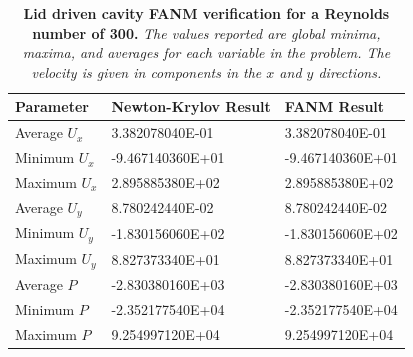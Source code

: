 \begin{table}[h!]
  \begin{center}
    \begin{tabular}{lll}\hline\hline
      \multicolumn{1}{l}{Parameter}& 
      \multicolumn{1}{l}{Newton-Krylov Result}&
      \multicolumn{1}{l}{FANM Result}\\
      \hline
      Average $U_x$ & 3.382078040E-01 & 3.382078040E-01 \\
      Minimum $U_x$ & -9.467140360E+01 & -9.467140360E+01 \\
      Maximum $U_x$ & 2.895885380E+02 & 2.895885380E+02 \\
      \hline
      Average $U_y$ & 8.780242440E-02 & 8.780242440E-02 \\
      Minimum $U_y$ & -1.830156060E+02 & -1.830156060E+02 \\
      Maximum $U_y$ & 8.827373340E+01 & 8.827373340E+01 \\
      \hline
      Average $P$ & -2.830380160E+03 & -2.830380160E+03 \\
      Minimum $P$ & -2.352177540E+04 & -2.352177540E+04 \\
      Maximum $P$ & 9.254997120E+04 & 9.254997120E+04 \\
      \hline\hline
    \end{tabular}
  \end{center}
  \caption{\textbf{Lid driven cavity FANM verification for a Reynolds
      number of 300.} \textit{The values reported are global minima,
      maxima, and averages for each variable in the problem. The
      velocity is given in components in the $x$ and $y$ directions.}}
  \label{tab:driven_re300_results}
\end{table}

